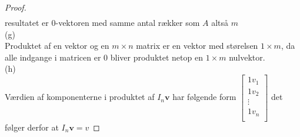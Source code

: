 \begin{proof}
\begin{align*}
\end{align*}
resultatet er 0-vektoren med samme antal rækker som $A$ altså $m$ \\
(g) \\
Produktet af en vektor og en $m \times n$ matrix er en vektor med størelsen $1 \times m$, da alle indgange i matricen er $0$ bliver produktet netop en $1 \times m$ nulvektor. 
\\
(h) \\
Værdien af komponenterne i produktet af $I_n\mathbf{v}$ har følgende form 
$\begin{bmatrix}
1v_1 \\
1v_2 \\
\vdots \\
1v_n  \\
\end{bmatrix}$
det følger derfor at $I_n\mathbf{v}=v$
\end{proof}